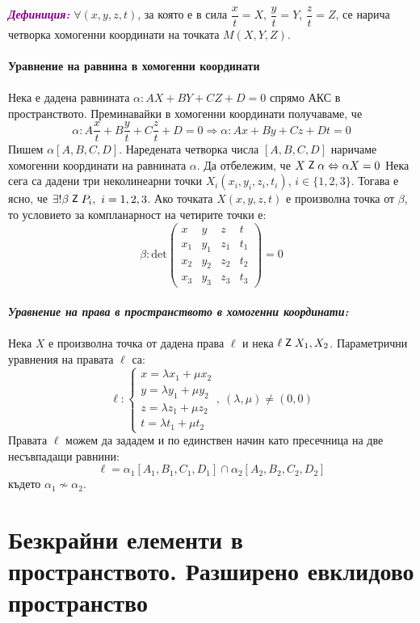 \documentclass[12pt]{article}
\newcommand{\inc}{\mathrel{\raisebox{0.18ex}{\small$\mathsf{Z}$}}}
\begin{document}
{{\\
\textbf{\textit{\textcolor{purple}{Дефиниция:}}} $\forall(x,y,z,t)$, за която е в сила $\dfrac{x}{t}=X$, $\dfrac{y}{t}=Y$, $\dfrac{z}{t}=Z$, се нарича четворка хомогенни координати на точката $M(X,Y,Z)$.
\\
\\
\textbf{Уравнение на равнина в хомогенни координати} \\
\\
Нека е дадена равнината $\alpha:AX+BY+CZ+D=0$ спрямо АКС в пространството. Преминавайки в хомогенни координати получаваме, че $$\alpha:A\dfrac{x}{t}+B\dfrac{y}{t}+C\dfrac{z}{t}+D=0\Rightarrow \alpha:Ax+By+Cz+Dt=0$$ Пишем $\alpha[A,B,C,D]$. Наредената четворка числа $[A,B,C,D]$ наричаме хомогенни координати на равнината $\alpha$. Да отбележим, че $X\inc\alpha\Leftrightarrow \alpha X=0$ Нека сега са дадени три неколинеарни точки $X_i(x_i,y_i,z_i,t_i)$, $i\in\{1,2,3\}$. Тогава е ясно, че $\exists ! \beta \inc P_i,\ i=1,2,3$. Ако точката $X(x,y,z,t)$ е произволна точка от $\beta$, то условието за компланарност на четирите точки е: $$\beta:\mathrm{det}\begin{pmatrix} x & y & z & t \\ x_1 & y_1 & z_1 & t_1 \\ x_2 & y_2 & z_2 & t_2 \\ x_3 & y_3 & z_3 & t_3 \end{pmatrix}=0$$} 
\\
\textbf{\textit{Уравнение на права в пространството в хомогенни координати:}}
\\
\\
Нека $X$ е произволна точка от дадена права $\ell$ и нека $\ell\inc X_1,X_2$. Параметрични уравнения на правата $\ell$ са: $$\ell:\begin{cases} x=\lambda x_1+\mu x_2 \\ y=\lambda y_1+\mu y_2 \\ z=\lambda z_1+\mu z_2 \\ t=\lambda t_1+\mu t_2\end{cases}, \ (\lambda,\mu)\neq(0,0)$$
Правата $\ell$ можем да зададем и по единствен начин като пресечница на две несъвпадащи равнини:  $$\ell=\alpha_1[A_1,B_1,C_1,D_1]\cap\alpha_2[A_2,B_2,C_2,D_2]$$ където $\alpha_1\not\sim\alpha_2$.\\}
\Large{\section{ Безкрайни елементи в пространството. Разширено евклидово пространство}}
\end{document}
